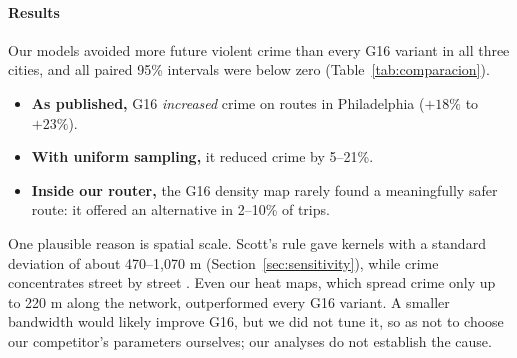 \documentclass[preprint,12pt,authoryear]{elsarticle}
\newcommand{\ajustar}[1]{\adjustbox{max width=\textwidth}{#1}}
\begin{document}
\paragraph{Results} Our models avoided more future violent crime than every G16 variant in all three cities, and all paired 95\% intervals were below zero (Table~\ref{tab:comparacion}).
\begin{itemize}
  \item \textbf{As published,} G16 \emph{increased} crime on routes in Philadelphia ($+18\%$ to $+23\%$).
  \item \textbf{With uniform sampling,} it reduced crime by 5--21\%.
  \item \textbf{Inside our router,} the G16 density map rarely found a meaningfully safer route: it offered an alternative in 2--10\% of trips.
\end{itemize}
One plausible reason is spatial scale. Scott's rule gave kernels with a standard deviation of about 470--1,070 m (Section~\ref{sec:sensitivity}), while crime concentrates street by street \citep{weisburd2015law}. Even our heat maps, which spread crime only up to 220 m along the network, outperformed every G16 variant. A smaller bandwidth would likely improve G16, but we did not tune it, so as not to choose our competitor's parameters ourselves; our analyses do not establish the cause.

\begin{table}[htbp]
\centering\small
\caption{Comparison with a published method (exploratory): change in future core incidents over all trips (lowest-risk route when offered, otherwise the fastest; for G16, the chosen hull route), \% (95\% CI resampling 1-km origin zones). Same trips and same past-crime information within each pair of rows.}
\label{tab:comparacion}
\ajustar{}
\end{table}
\end{document}
